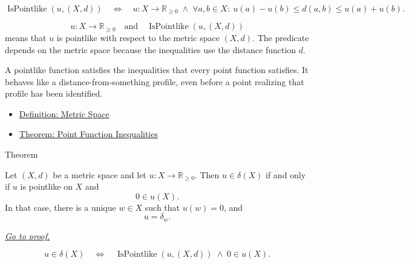 \begin{remark*}
\[
\operatorname{IsPointlike}(u,(X,d))
\quad\Longleftrightarrow\quad
u\colon X\to\mathbb{R}_{\geq 0}
\;\land\;
\forall a,b\in X{:}\ u(a)-u(b)\leq d(a,b)\leq u(a)+u(b).
\]
\end{remark*}

\begin{remark*}
\[
u\colon X\to\mathbb{R}_{\geq 0}
\quad\text{and}\quad
\operatorname{IsPointlike}(u,(X,d))
\]
means that \(u\) is pointlike with respect to the metric space \((X,d)\).
The predicate depends on the metric space because the inequalities use the
distance function \(d\).
\end{remark*}

\begin{remark*}[Interpretation]
A pointlike function satisfies the inequalities that every point function
satisfies.  It behaves like a distance-from-something profile, even before a
point realizing that profile has been identified.
\end{remark*}

\begin{dependencies}
\begin{itemize}
  \item \hyperref[def:metric-space]{Definition: Metric Space}
  \item \hyperref[thm:metric-point-function-inequalities]{Theorem: Point Function Inequalities}
\end{itemize}
\end{dependencies}

\begin{theorembox}{Theorem}
\begin{theorem}
\label{thm:metric-pointlike-zero-point-function}
Let \((X,d)\) be a metric space and let \(u:X\to\mathbb{R}_{\geq 0}\).  Then
\(u\in\delta(X)\) if and only if \(u\) is pointlike on \(X\) and
\[
  0\in u(X).
\]
In that case, there is a unique \(w\in X\) such that \(u(w)=0\), and
\[
  u=\delta_w.
\]

\smallskip
\noindent
\hyperref[prf:metric-pointlike-zero-point-function]{\textit{Go to proof.}}
\end{theorem}
\end{theorembox}

\begin{remark*}
\[
u\in\delta(X)
\quad\Longleftrightarrow\quad
\operatorname{IsPointlike}(u,(X,d))
\;\land\;
0\in u(X).
\]
\end{remark*}

